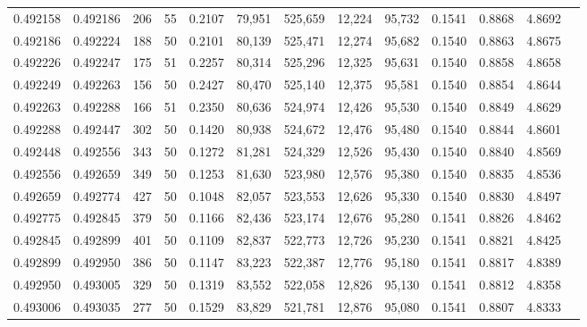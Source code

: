 \begin{tabular}{rrrrrrrrrrrrr}
0.492158 & 0.492186 & 206 &  55 &                                     0.2107 &  79,951 & 525,659 &  12,224 &  95,732 & 0.1541 & 0.8868 & 4.8692 \\
0.492186 & 0.492224 & 188 &  50 &                                     0.2101 &  80,139 & 525,471 &  12,274 &  95,682 & 0.1540 & 0.8863 & 4.8675 \\
0.492226 & 0.492247 & 175 &  51 &                                     0.2257 &  80,314 & 525,296 &  12,325 &  95,631 & 0.1540 & 0.8858 & 4.8658 \\
0.492249 & 0.492263 & 156 &  50 &                                     0.2427 &  80,470 & 525,140 &  12,375 &  95,581 & 0.1540 & 0.8854 & 4.8644 \\
0.492263 & 0.492288 & 166 &  51 &                                     0.2350 &  80,636 & 524,974 &  12,426 &  95,530 & 0.1540 & 0.8849 & 4.8629 \\
0.492288 & 0.492447 & 302 &  50 &                                     0.1420 &  80,938 & 524,672 &  12,476 &  95,480 & 0.1540 & 0.8844 & 4.8601 \\
0.492448 & 0.492556 & 343 &  50 &                                     0.1272 &  81,281 & 524,329 &  12,526 &  95,430 & 0.1540 & 0.8840 & 4.8569 \\
0.492556 & 0.492659 & 349 &  50 &                                     0.1253 &  81,630 & 523,980 &  12,576 &  95,380 & 0.1540 & 0.8835 & 4.8536 \\
0.492659 & 0.492774 & 427 &  50 &                                     0.1048 &  82,057 & 523,553 &  12,626 &  95,330 & 0.1540 & 0.8830 & 4.8497 \\
0.492775 & 0.492845 & 379 &  50 &                                     0.1166 &  82,436 & 523,174 &  12,676 &  95,280 & 0.1541 & 0.8826 & 4.8462 \\
0.492845 & 0.492899 & 401 &  50 &                                     0.1109 &  82,837 & 522,773 &  12,726 &  95,230 & 0.1541 & 0.8821 & 4.8425 \\
0.492899 & 0.492950 & 386 &  50 &                                     0.1147 &  83,223 & 522,387 &  12,776 &  95,180 & 0.1541 & 0.8817 & 4.8389 \\
0.492950 & 0.493005 & 329 &  50 &                                     0.1319 &  83,552 & 522,058 &  12,826 &  95,130 & 0.1541 & 0.8812 & 4.8358 \\
0.493006 & 0.493035 & 277 &  50 &                                     0.1529 &  83,829 & 521,781 &  12,876 &  95,080 & 0.1541 & 0.8807 & 4.8333 \\

\end{tabular}
